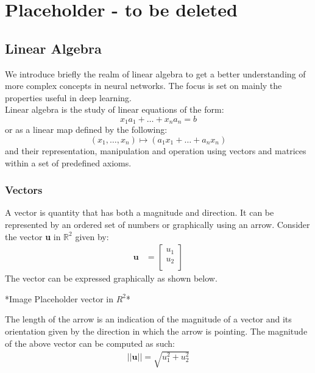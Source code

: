 \chapter{Placeholder - to be deleted}
\section{Linear Algebra}
We introduce briefly the realm of linear algebra to get a better understanding of more complex concepts in neural networks. The focus is set on mainly the properties useful in deep learning. \\
Linear algebra is the study of linear equations of the form:
\begin{equation}
    x_1a_1 + \dots + x_na_n = b
\end{equation}
or as a linear map defined by the following:
\begin{equation}
    (x_1, \dots, x_n) \mapsto (a_1 x_1 + \dots + a_n x_n) \label{eq:2.11}
\end{equation}
and their representation, manipulation and operation using vectors and matrices within a set of predefined axioms. 
\subsection{Vectors}
A vector is quantity that has both a magnitude and direction. It can be represented by an ordered set of numbers or graphically using an arrow.
Consider the vector \textbf{u} in $\mathbb{R}^2$ given by:
\begin{align}
    \textbf{u} &= \begin{bmatrix}
           u_1 \\
           u_2 \\
         \end{bmatrix}
  \end{align}
The vector can be expressed graphically as shown below.
\begin{center}
    *Image Placeholder vector in $R^2$*    
\end{center}

\noindent The length of the arrow is an indication of the magnitude of a vector and its orientation given by the direction in which the arrow is pointing. The magnitude of the above vector can be computed as such:
\begin{align}
    ||\textbf{u}|| = \sqrt{u_1^2+u_2^2}
\end{align}

